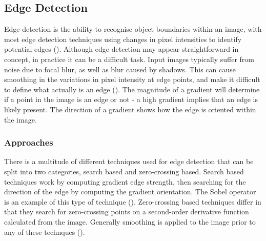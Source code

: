 \documentclass[12pt]{report}
\begin{document}
\subsection{Edge Detection}
\begin{flushleft}
Edge detection is the ability to recognise object boundaries within an image, with most edge detection techniques using changes in pixel intensities to identify potential edges (\cite{arbelaez2011contour}). Although edge detection may appear straightforward in concept, in practice it can be a difficult task. Input images typically suffer from noise due to focal blur, as well as blur caused by shadows. This can cause smoothing in the variations in pixel intensity at edge points, and make it difficult to define what actually is an edge (\cite{ziou1998edge}). The magnitude of a gradient will determine if a point in the image is an edge or not - a high gradient implies that an edge is likely present. The direction of a gradient shows how the edge is oriented within the image.
\end{flushleft}

\subsubsection{Approaches}
\begin{flushleft}
There is a multitude of different techniques used for edge detection that can be split into two categories, search based and zero-crossing based. Search based techniques work by computing gradient edge strength, then searching for the direction of the edge by computing the gradient orientation. The Sobel operator is an example of this type of technique (\cite{gupta2013sobel}). Zero-crossing based techniques differ in that they search for zero-crossing points on a second-order derivative function calculated from the image. Generally smoothing is applied to the image prior to any of these technques (\cite{ziou1998edge}).
\end{flushleft}
\end{document}
